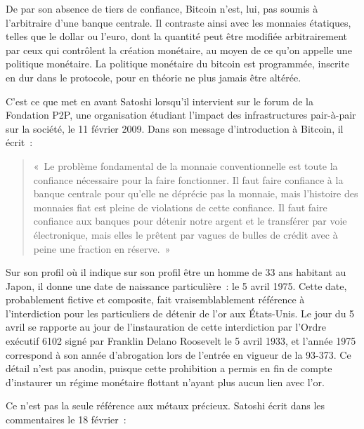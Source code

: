 De par son absence de tiers de confiance, Bitcoin n'est, lui, pas soumis à l'arbitraire d'une banque centrale. Il contraste ainsi avec les monnaies étatiques, telles que le dollar ou l'euro, dont la quantité peut être modifiée arbitrairement par ceux qui contrôlent la création monétaire, au moyen de ce qu'on appelle une politique monétaire. La politique monétaire du bitcoin est programmée, inscrite en dur dans le protocole, pour en théorie ne plus jamais être altérée.

C'est ce que met en avant Satoshi lorsqu'il intervient sur le forum de la Fondation P2P, une organisation étudiant l'impact des infrastructures pair-à-pair sur la société, le 11 février 2009. Dans son message d'introduction à Bitcoin, il écrit~:

\begin{quote}
«~Le problème fondamental de la monnaie conventionnelle est toute la confiance nécessaire pour la faire fonctionner. Il faut faire confiance à la banque centrale pour qu'elle ne déprécie pas la monnaie, mais l'histoire des monnaies fiat est pleine de violations de cette confiance. Il faut faire confiance aux banques pour détenir notre argent et le transférer par voie électronique, mais elles le prêtent par vagues de bulles de crédit avec à peine une fraction en réserve.~»
\end{quote}

Sur son profil où il indique sur son profil être un homme de 33 ans habitant au Japon, il donne une date de naissance particulière~: le 5 avril 1975. Cette date, probablement fictive et composite, fait vraisemblablement référence à l'interdiction pour les particuliers de détenir de l'or aux États-Unis. Le jour du 5 avril se rapporte au jour de l'instauration de cette interdiction par l'Ordre exécutif 6102 signé par Franklin Delano Roosevelt le 5 avril 1933, et l'année 1975 correspond à son année d'abrogation lors de l'entrée en vigueur de la  93-373. Ce détail n'est pas anodin, puisque cette prohibition a permis en fin de compte d'instaurer un régime monétaire flottant n'ayant plus aucun lien avec l'or.

Ce n'est pas la seule référence aux métaux précieux. Satoshi écrit dans les commentaires le 18 février~:

